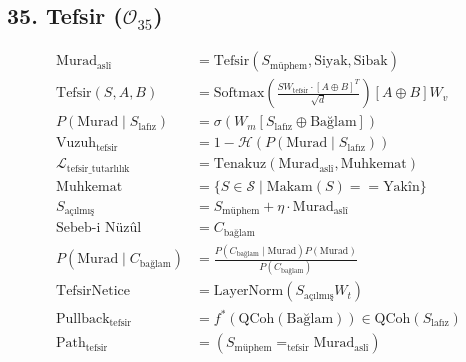 \documentclass[11pt, a4paper]{article}
\begin{document}
\subsection{35. Tefsir ($\mathcal{O}_{35}$)}
\begin{align}
\text{Murad}_{\text{aslî}} &= \text{Tefsir}(S_{\text{müphem}}, \text{Siyak}, \text{Sibak}) \\
\text{Tefsir}(S, A, B) &= \text{Softmax}\left( \frac{S W_{\text{tefsir}} \cdot [A \oplus B]^T}{\sqrt{d}} \right) [A \oplus B] W_v \\
P(\text{Murad} \mid S_{\text{lafız}}) &= \sigma( W_m [S_{\text{lafız}} \oplus \text{Bağlam}] ) \\
\text{Vuzuh}_{\text{tefsir}} &= 1 - \mathcal{H}(P(\text{Murad} \mid S_{\text{lafız}})) \\
\mathcal{L}_{\text{tefsir\_tutarlılık}} &= \text{Tenakuz}(\text{Murad}_{\text{aslî}}, \text{Muhkemat}) \\
\text{Muhkemat} &= \{ S \in \mathcal{S} \mid \text{Makam}(S) == \text{Yakîn} \} \\
S_{\text{açılmış}} &= S_{\text{müphem}} + \eta \cdot \text{Murad}_{\text{aslî}} \\
\text{Sebeb-i Nüzûl} &= C_{\text{bağlam}} \\
P(\text{Murad} \mid C_{\text{bağlam}}) &= \frac{P(C_{\text{bağlam}} \mid \text{Murad}) P(\text{Murad})}{P(C_{\text{bağlam}})} \\
\text{TefsirNetice} &= \text{LayerNorm}(S_{\text{açılmış}} W_t) \\
\text{Pullback}_{\text{tefsir}} &= f^*(\text{QCoh}(\text{Bağlam})) \in \text{QCoh}(S_{\text{lafız}}) \\
\text{Path}_{\text{tefsir}} &= (S_{\text{müphem}} =_{\text{tefsir}} \text{Murad}_{\text{aslî}})
\end{align}
\end{document}
